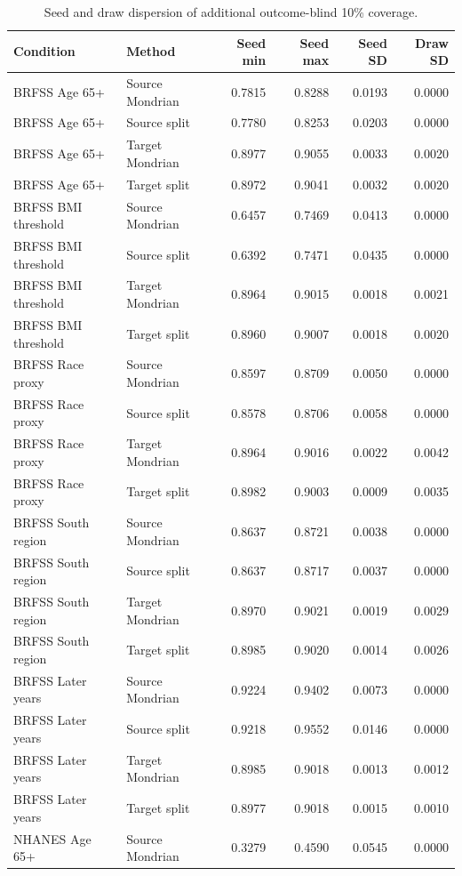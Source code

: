 \begin{longtable}{llrrrr}
\caption{Seed and draw dispersion of additional outcome-blind 10\% coverage.}\\
\toprule
Condition & Method & Seed min & Seed max & Seed SD & Draw SD \\
\midrule\endhead
BRFSS Age 65+ & Source Mondrian & 0.7815 & 0.8288 & 0.0193 & 0.0000 \\
BRFSS Age 65+ & Source split & 0.7780 & 0.8253 & 0.0203 & 0.0000 \\
BRFSS Age 65+ & Target Mondrian & 0.8977 & 0.9055 & 0.0033 & 0.0020 \\
BRFSS Age 65+ & Target split & 0.8972 & 0.9041 & 0.0032 & 0.0020 \\
BRFSS BMI threshold & Source Mondrian & 0.6457 & 0.7469 & 0.0413 & 0.0000 \\
BRFSS BMI threshold & Source split & 0.6392 & 0.7471 & 0.0435 & 0.0000 \\
BRFSS BMI threshold & Target Mondrian & 0.8964 & 0.9015 & 0.0018 & 0.0021 \\
BRFSS BMI threshold & Target split & 0.8960 & 0.9007 & 0.0018 & 0.0020 \\
BRFSS Race proxy & Source Mondrian & 0.8597 & 0.8709 & 0.0050 & 0.0000 \\
BRFSS Race proxy & Source split & 0.8578 & 0.8706 & 0.0058 & 0.0000 \\
BRFSS Race proxy & Target Mondrian & 0.8964 & 0.9016 & 0.0022 & 0.0042 \\
BRFSS Race proxy & Target split & 0.8982 & 0.9003 & 0.0009 & 0.0035 \\
BRFSS South region & Source Mondrian & 0.8637 & 0.8721 & 0.0038 & 0.0000 \\
BRFSS South region & Source split & 0.8637 & 0.8717 & 0.0037 & 0.0000 \\
BRFSS South region & Target Mondrian & 0.8970 & 0.9021 & 0.0019 & 0.0029 \\
BRFSS South region & Target split & 0.8985 & 0.9020 & 0.0014 & 0.0026 \\
BRFSS Later years & Source Mondrian & 0.9224 & 0.9402 & 0.0073 & 0.0000 \\
BRFSS Later years & Source split & 0.9218 & 0.9552 & 0.0146 & 0.0000 \\
BRFSS Later years & Target Mondrian & 0.8985 & 0.9018 & 0.0013 & 0.0012 \\
BRFSS Later years & Target split & 0.8977 & 0.9018 & 0.0015 & 0.0010 \\
NHANES Age 65+ & Source Mondrian & 0.3279 & 0.4590 & 0.0545 & 0.0000 \\

\end{longtable}

